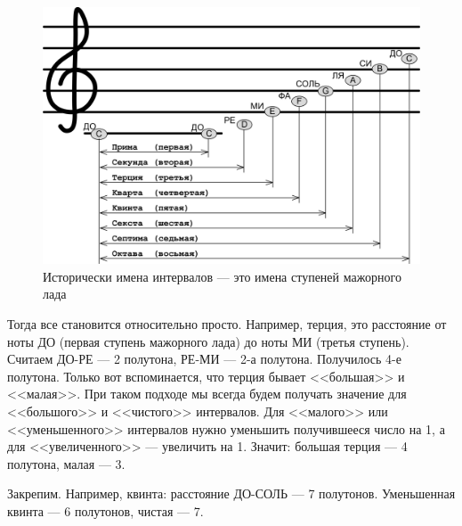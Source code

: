 \begin{figure}[!ht]
    \centering
    \includegraphics[width=\textwidth]{fig/intervals/interval-names} 
    \caption{Исторически имена интервалов --- это имена ступеней мажорного лада}\label{fig:harmony:interval:names}
\end{figure} 

Тогда все становится относительно просто. Например, терция, это расстояние от ноты ДО (первая ступень мажорного лада) до ноты МИ (третья ступень). Считаем ДО-РЕ --- 2 полутона, РЕ-МИ --- 2-а полутона. Получилось 4-е полутона. Только вот вспоминается, что терция бывает <<большая>> и <<малая>>. При таком подходе мы всегда будем получать значение для <<большого>> и <<чистого>> интервалов. Для <<малого>> или <<уменьшенного>> интервалов нужно уменьшить получившееся число на 1, а для <<увеличенного>> --- увеличить на 1. Значит: большая терция --- 4 полутона, малая --- 3.

Закрепим. Например, квинта: расстояние ДО-СОЛЬ --- 7 полутонов. Уменьшенная квинта --- 6 полутонов, чистая --- 7.

